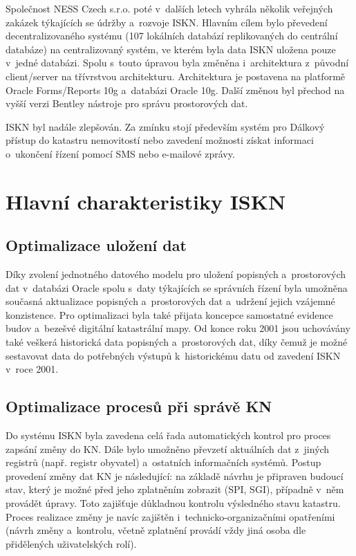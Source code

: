 \documentclass[a4paper,12pt,oneside]{book}
\begin{document}
Společnost NESS Czech s.r.o. poté v~dalších letech vyhrála několik veřejných zakázek týkajících se údržby a~rozvoje ISKN. Hlavním cílem bylo převedení decentralizovaného systému (107 lokálních databází replikovaných do centrální databáze) na centralizovaný systém, ve kterém byla data ISKN uložena pouze v~jedné databázi. Spolu s~touto úpravou byla změněna i~architektura z~původní client/server na třívrstvou architekturu. Architektura je postavena na platformě Oracle Forms/Reports 10g a~databázi Oracle 10g. Další změnou byl přechod na vyšší verzi Bentley nástroje pro správu prostorových dat. \cite{iskn}

ISKN byl nadále zlepšován. Za zmínku stojí především systém pro Dálkový přístup do katastru nemovitostí nebo zavedení možnosti získat informaci o~ukončení řízení pomocí SMS nebo e-mailové zprávy. \cite{iskn}


\section{Hlavní charakteristiky ISKN}

\subsection{Optimalizace uložení dat}

Díky zvolení jednotného datového modelu pro uložení popisných a~prostorových dat v~databázi Oracle spolu s~daty týkajících se správních řízení byla umožněna současná aktualizace popisných a~prostorových dat a~udržení jejich vzájemné konzistence. Pro optimalizaci byla také přijata koncepce samostatné evidence budov a~bezešvé digitální katastrální mapy. Od konce roku 2001 jsou uchovávány také veškerá historická data popisných a~prostorových dat, díky čemuž je možné sestavovat data do potřebných výstupů k~historickému datu od zavedení ISKN v~roce 2001. \cite{iskn}

\subsection{Optimalizace procesů při správě KN}

Do systému ISKN byla zavedena celá řada automatických kontrol pro proces zapsání změny do KN. Dále bylo umožněno převzetí aktuálních dat z~jiných registrů (např. registr obyvatel) a~ostatních informačních systémů. Postup provedení změny dat KN je následující: na základě návrhu je připraven budoucí stav, který je možné před jeho zplatněním zobrazit (SPI, SGI), případně v~něm provádět úpravy. Toto zajišťuje důkladnou kontrolu výsledného stavu katastru. Proces realizace změny je navíc zajištěn i~technicko-organizačními opatřeními (návrh změny a~kontrolu, včetně zplatnění provádí vždy jiná osoba dle přidělených uživatelských rolí). \cite{iskn}
\end{document}
